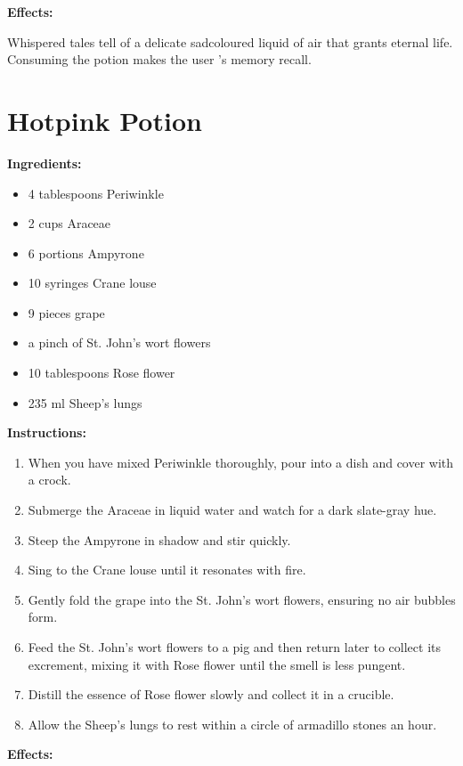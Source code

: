 \documentclass{article}
\begin{document}
\textbf{Effects:}

Whispered tales tell of a delicate sadcoloured liquid of air that grants eternal life. Consuming the potion makes the user 's memory recall.

\newpage
\section*{Hotpink Potion}

\textbf{Ingredients:}

\begin{itemize}
  \item 4 tablespoons Periwinkle
  \item 2 cups Araceae
  \item 6 portions Ampyrone
  \item 10 syringes Crane louse
  \item 9 pieces grape
  \item a pinch of St. John's wort flowers
  \item 10 tablespoons Rose flower
  \item 235 ml Sheep's lungs
\end{itemize}

\textbf{Instructions:}

\begin{enumerate}
  \item When you have mixed Periwinkle thoroughly, pour into a dish and cover with a crock.
  \item Submerge the Araceae in liquid water and watch for a dark slate-gray hue.
  \item Steep the Ampyrone in shadow and stir quickly.
  \item Sing to the Crane louse until it resonates with fire.
  \item Gently fold the grape into the St. John's wort flowers, ensuring no air bubbles form.
  \item Feed the St. John's wort flowers to a pig and then return later to collect its excrement, mixing it with Rose flower until the smell is less pungent.
  \item Distill the essence of Rose flower slowly and collect it in a crucible.
  \item Allow the Sheep's lungs to rest within a circle of armadillo stones an hour.
\end{enumerate}

\textbf{Effects:}
\end{document}
